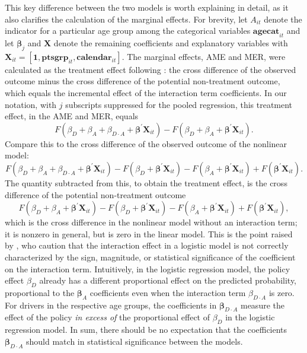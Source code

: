This key difference between the two models is worth explaining in detail, 
as it also clarifies the calculation of the marginal effects. 
%
For brevity, let $A_{it}$ denote the indicator for a particular age group 
among the categorical variables $\bm{agecat}_{it}$
and let $\bm{\beta}_j$ and $\bm{X}$ denote 
the remaining coefficients and explanatory variables 
with $\bm{X}_{it} = [\bm{1}, \bm{ptsgrp}_{it}, \bm{calendar}_{it}]$. 
% 
The marginal effects, AME and MER, 
were calculated as the treatment effect following \citet{puhani2012}:
the cross difference of the observed outcome 
minus the cross difference of the potential non-treatment outcome, 
which equals the incremental effect of the interaction term coefficients. 
In our notation, with $j$ subscripts suppressed for the pooled regression, 
this treatment effect, in the AME and MER, equals
$$
	F(\beta_D + \beta_A + \beta_{D\cdot A} + \bm{\beta}^\prime \bm{X}_{it})
		- F(\beta_D + \beta_A + \bm{\beta}^\prime \bm{X}_{it}).
$$
Compare this to the cross difference of the observed outcome of the nonlinear model: 
$$
	F(\beta_D + \beta_A + \beta_{D\cdot A} + \bm{\beta}^\prime \bm{X}_{it})
		- F(\beta_D + \bm{\beta}^\prime \bm{X}_{it})
		- F(\beta_A + \bm{\beta}^\prime \bm{X}_{it})
		+ F(\bm{\beta}^\prime \bm{X}_{it}).
$$
The quantity subtracted from this, to obtain the treatment effect, 
is the cross difference of the potential non-treatment outcome 
$$
	F(\beta_D + \beta_A + \bm{\beta}^\prime \bm{X}_{it})
		- F(\beta_D + \bm{\beta}^\prime \bm{X}_{it})
		- F(\beta_A + \bm{\beta}^\prime \bm{X}_{it})
		+ F(\bm{\beta}^\prime \bm{X}_{it}), 
$$
which is the cross difference in the nonlinear model 
without an interaction term; it is nonzero in general, 
but is zero in the linear model. 
% 
This is the point raised by  
\citet{ainorton2003}, who caution that 
the interaction effect in a logistic model 
is not correctly characterized by the
sign, magnitude, or statistical significance of the coefficient on the
interaction term.
Intuitively, in the logistic regression model, the policy effect $\beta_D$
already has a different proportional effect on the predicted probability, 
proportional to the $\bm{\beta}_A$ coefficients
even when the interaction term $\beta_{D\cdot A}$ is zero. 
For drivers in the respective age groups,
the coefficients in $\bm{\beta}_{D\cdot A}$ measure the effect of the policy
\emph{in excess of} the proportional effect of $\beta_D$
in the logistic regression model. 
In sum, there should be no expectation that the coefficients $\bm{\beta}_{D\cdot A}$
should match in statistical significance between the models. 

